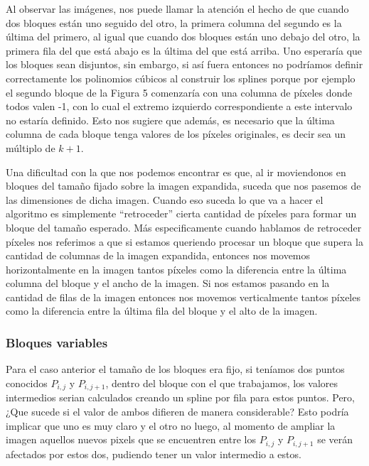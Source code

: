 \documentclass[a4paper]{article}
\newcounter{col}
\begin{document}
Al observar las imágenes, nos puede llamar la atención el hecho de que cuando dos bloques están uno seguido del otro, la primera columna del segundo es la última del primero, al igual que cuando dos bloques están uno debajo del otro, la primera fila del que está abajo es la última del que está arriba. Uno esperaría que los bloques sean disjuntos, sin embargo, si así fuera entonces no podríamos definir correctamente los polinomios cúbicos al construir los splines porque por ejemplo el segundo bloque de la Figura 5 comenzaría con una columna de píxeles donde todos valen -1, con lo cual el extremo izquierdo correspondiente a este intervalo no estaría definido. Esto nos sugiere que además, es necesario que la última columna de cada bloque tenga valores de los píxeles originales, es decir sea un múltiplo de $k + 1$.
\par Una dificultad con la que nos podemos encontrar es que, al ir moviendonos en bloques del tamaño fijado sobre la imagen expandida, suceda que nos pasemos de las dimensiones de dicha imagen. Cuando eso suceda lo que va a hacer el algoritmo es simplemente ``retroceder'' cierta cantidad de píxeles para formar un bloque del tamaño esperado. Más especificamente cuando hablamos de retroceder píxeles nos referimos a que si estamos queriendo procesar un bloque que supera la cantidad de columnas de la imagen expandida, entonces nos movemos horizontalmente en la imagen tantos píxeles como la diferencia entre la última columna del bloque y el ancho de la imagen. Si nos estamos pasando en la cantidad de filas de la imagen entonces nos movemos verticalmente tantos píxeles como la diferencia entre la última fila del bloque y el alto de la imagen.

\subsubsection{Bloques variables}

Para el caso anterior el tamaño de los bloques era fijo, si teníamos dos puntos conocidos $P_{i,j}$ y  $P_{i,j+1} $, dentro del bloque con el que trabajamos, los valores intermedios serian calculados creando un spline por fila para estos puntos. Pero, ¿Que sucede si el valor de ambos difieren de manera considerable? Esto podría implicar que uno es muy claro y el otro no luego, al momento de ampliar la imagen aquellos nuevos pixels que se encuentren entre los $ P_{i,j} $ y  $P_{i,j+1}$ se verán afectados por estos dos, pudiendo tener un valor intermedio a estos.  
 
\end{document}
